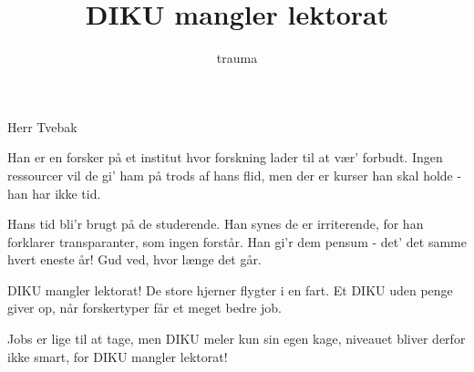 \documentclass[danish]{article}
\title{DIKU mangler lektorat}
\author{trauma}
\begin{document}
\maketitle

\begin{roles}
   Herr Tvebak
\end{roles}

\begin{song}

Han er en forsker på et institut
hvor forskning lader til at vær' forbudt.
Ingen ressourcer vil de gi' ham på trods af hans flid,
men der er kurser han skal holde - han har ikke tid.

Hans tid bli'r brugt på de studerende.
Han synes de er irriterende,
for han forklarer transparanter, som ingen forstår.
Han gi'r dem pensum - det' det samme hvert eneste år!
Gud ved, hvor længe det går.

DIKU mangler lektorat!
De store hjerner flygter i en fart.
Et DIKU uden penge giver op,
når forskertyper får et meget bedre job.

Jobs er lige til at tage,
men DIKU meler kun sin egen kage,
niveauet bliver derfor ikke smart,
for DIKU mangler lektorat!


\end{song}
\end{document}
